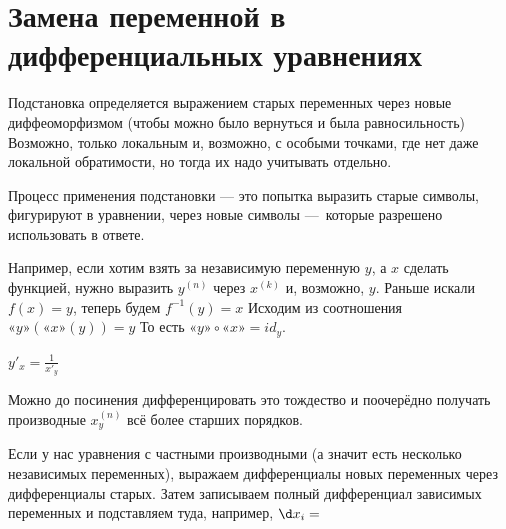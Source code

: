 \documentclass[12pt, a4paper]{article}
\begin{document}
\section{Замена переменной в дифференциальных уравнениях}

Подстановка определяется выражением старых переменных через новые диффеоморфизмом (чтобы можно было вернуться и была равносильность)
Возможно, только локальным и, возможно, с особыми точками, где нет даже локальной обратимости, но тогда их надо учитывать отдельно.

Процесс применения подстановки — это попытка выразить старые символы, фигурируют в уравнении, через новые символы — которые разрешено использовать в ответе.

Например, если хотим взять за независимую переменную $y$, а $x$ сделать функцией, нужно выразить $y^{(n)}$ через $x^{(k)}$ и, возможно, $y$.
Раньше искали $f(x) = y$, теперь будем $f^{-1}(y) = x$
Исходим из соотношения $«y»(«x»(y)) = y$
То есть $«y» \circ «x» = id_y$.

$y'_x = \frac{1}{x'_y}$

Можно до посинения дифференцировать это тождество 
и поочерёдно получать производные $x^{(n)}_y$ всё более старших порядков.

Если у нас уравнения с частными производными (а значит есть несколько независимых переменных),
выражаем дифференциалы новых переменных через дифференциалы старых. 
Затем записываем полный дифференциал зависимых переменных и подставляем туда, например, $\d x_i = $
\end{document}
